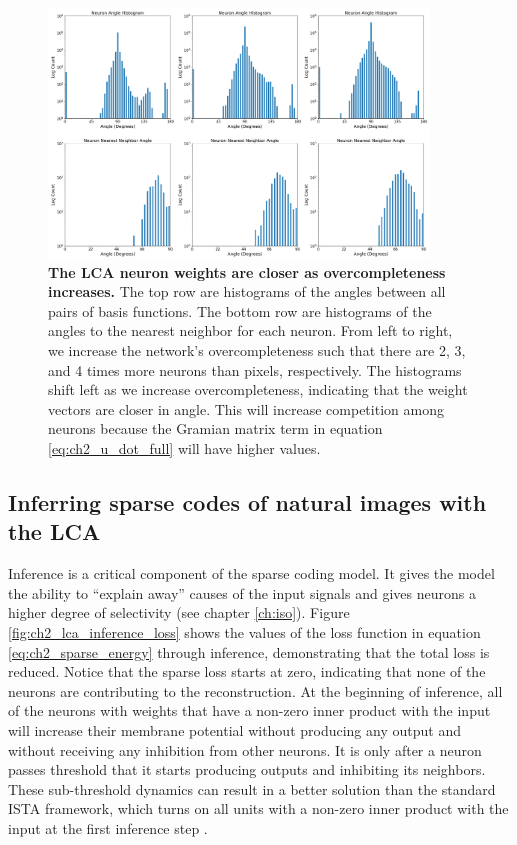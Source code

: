 \begin{figure}[h]
    \centering
    \includegraphics[width=0.9\textwidth]{figures/lca_angle_hists.png}
    \caption{\textbf{The LCA neuron weights are closer as overcompleteness increases.} The top row are histograms of the angles between all pairs of basis functions. The bottom row are histograms of the angles to the nearest neighbor for each neuron. From left to right, we increase the network's overcompleteness such that there are 2, 3, and 4 times more neurons than pixels, respectively. The histograms shift left as we increase overcompleteness, indicating that the weight vectors are closer in angle. This will increase competition among neurons because the Gramian matrix term in equation \eqref{eq:ch2_u_dot_full} will have higher values.}
    \label{fig:ch2_lca_angle_histograms}
\end{figure}


\subsection{Inferring sparse codes of natural images with the LCA}
Inference is a critical component of the sparse coding model. It gives the model the ability to ``explain away'' causes of the input signals \parencite{olshausen1997sparse} and gives neurons a higher degree of selectivity (see chapter \ref{ch:iso}). Figure \ref{fig:ch2_lca_inference_loss} shows the values of the loss function in equation \eqref{eq:ch2_sparse_energy} through inference, demonstrating that the total loss is reduced. Notice that the sparse loss starts at zero, indicating that none of the neurons are contributing to the reconstruction. At the beginning of inference, all of the neurons with weights that have a non-zero inner product with the input will increase their membrane potential without producing any output and without receiving any inhibition from other neurons. It is only after a neuron passes threshold that it starts producing outputs and inhibiting its neighbors. These sub-threshold dynamics can result in a better solution than the standard ISTA framework, which turns on all units with a non-zero inner product with the input at the first inference step \parencite{rozell2008sparse}.

